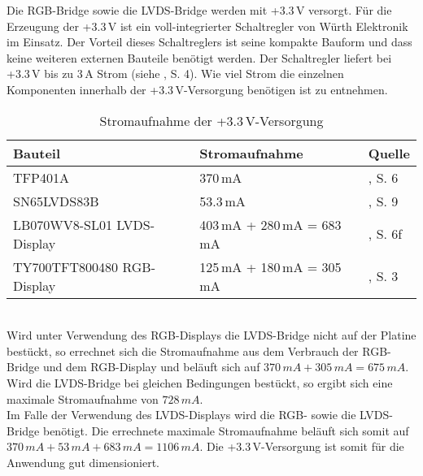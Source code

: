 Die RGB-Bridge  sowie die LVDS-Bridge  werden mit +3.3\,V versorgt. Für die Erzeugung der +3.3\,V ist ein voll-integrierter Schaltregler  von Würth Elektronik im Einsatz. Der Vorteil dieses Schaltreglers ist seine kompakte Bauform und dass keine weiteren externen Bauteile benötigt werden. Der Schaltregler liefert bei +3.3\,V bis zu 3\,A Strom (siehe \cite{Wuerth2013}, S. 4). Wie viel Strom die einzelnen Komponenten innerhalb der +3.3\,V-Versorgung benötigen ist  zu entnehmen.
\begin{table}[h]
\begin{tabular}{|p{3cm}|p{5cm}|p{4.5cm}|}\hline
\rowcolor{TableBackgroundColor} 
   \textbf{Bauteil} & \textbf{Stromaufnahme} & \textbf{Quelle}	\\ \hline
    TFP401A & 370\,mA & \cite{TI2011}, S. 6\\ \hline
	SN65LVDS83B & 53.3\,mA & \cite{TI2011b}, S. 9\\ \hline
	LB070WV8-SL01 LVDS-Display & 403\,mA + 280\,mA = 683\,mA & \cite{LG2012}, S. 6f\\  \hline
	TY700TFT800480 RGB-Display & 125\,mA + 180\,mA = 305\,mA & \cite{Techtoys2012}, S. 3\\ \hline
\end{tabular}
\caption{Stromaufnahme der +3.3\,V-Versorgung}
\label{tab:3_3v_strom}
\end{table} \\
Wird unter Verwendung des RGB-Displays die LVDS-Bridge nicht auf der Platine bestückt, so errechnet sich die Stromaufnahme aus dem Verbrauch der RGB-Bridge und dem RGB-Display und beläuft sich auf  $370\,mA + 305\,mA = 675\,mA$. Wird die LVDS-Bridge bei gleichen Bedingungen bestückt, so ergibt sich eine maximale Stromaufnahme von $728\,mA$.\\
Im Falle der Verwendung des LVDS-Displays wird die RGB- sowie die LVDS-Bridge benötigt. Die errechnete maximale Stromaufnahme beläuft sich somit auf $370\,mA + 53\,mA + 683\,mA = 1106\,mA$. Die +3.3\,V-Versorgung ist somit für die Anwendung gut dimensioniert.\newline

